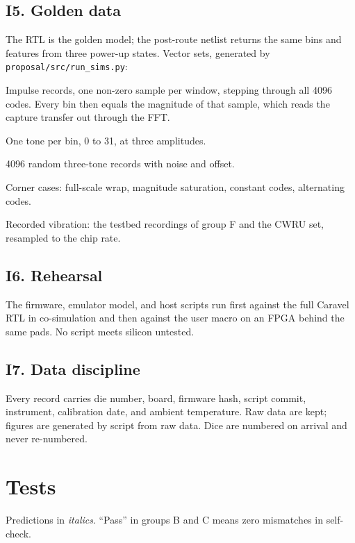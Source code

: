 \documentclass[10pt]{article}
\newcommand{\pred}[1]{\textit{#1}}
\begin{document}
\subsection*{I5. Golden data}
The RTL is the golden model; the post-route netlist returns the same bins
and features from three power-up states. Vector sets, generated by
\texttt{proposal/src/run\_sims.py}:
\begin{description}[leftmargin=2.2em,style=nextline,itemsep=0pt]
\item[V1] Impulse records, one non-zero sample per window, stepping
through all \num{4096} codes. Every bin then equals the magnitude of that
sample, which reads the capture transfer out through the FFT.
\item[V2] One tone per bin, 0 to 31, at three amplitudes.
\item[V3] \num{4096} random three-tone records with noise and offset.
\item[V4] Corner cases: full-scale wrap, magnitude saturation, constant codes, alternating codes.
\item[V5] Recorded vibration: the testbed recordings of group F and the
CWRU set, resampled to the chip rate.
\end{description}

\subsection*{I6. Rehearsal}
The firmware, emulator model, and host scripts run first against the full
Caravel RTL in co-simulation and then against the user macro on an FPGA
behind the same pads. No script meets silicon untested.

\subsection*{I7. Data discipline}
Every record carries die number, board, firmware hash, script commit,
instrument, calibration date, and ambient temperature. Raw data are kept;
figures are generated by script from raw data. Dice are numbered on
arrival and never re-numbered.

\section{Tests}
\label{sec:tests}
Predictions in \pred{italics}. ``Pass'' in groups B and C means zero
mismatches in self-check.
\end{document}
